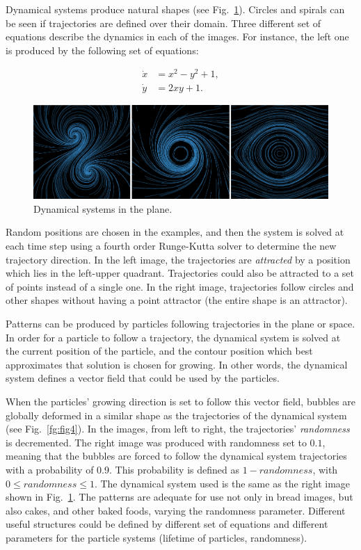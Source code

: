 \documentclass[oneside,a4paper,english,links]{amca}
\begin{document}
Dynamical systems produce natural shapes (see
Fig.~\ref{fg:fig3}). Circles and spirals can be seen if trajectories
are defined over their domain. Three different set of equations
describe the dynamics in each of the images. For instance, the left
one is produced by the following set of equations:

\begin{equation} \label{eq:simple}  
  \begin{aligned}
    \dot{x} &= x^{2}-y^{2}+1,\\
    \dot{y} &= 2xy+1.
  \end{aligned}
\end{equation}


\begin{figure}[htb!]
  \centerline{\includegraphics[scale=0.28]{fig3}}
  \caption{Dynamical systems in the plane.}
  \label{fg:fig3}
\end{figure}


Random positions are chosen in the examples, and then the system is solved at each time step using a fourth order Runge-Kutta solver to determine the new trajectory direction. In the left image, the trajectories are {\em attracted} by a position which lies in the left-upper quadrant. Trajectories could also be attracted to a set of points instead of a single one. In the right image, trajectories follow circles and other shapes without having a point attractor (the entire shape is an attractor).

Patterns can be produced by particles following trajectories in the plane or space. In order for a particle to follow a trajectory, the dynamical system is solved at the current position of the particle, and the contour position which best approximates that solution is chosen for growing. In other words, the dynamical system defines a vector field that could be used by the particles.

When the particles' growing direction is set to follow this vector field, bubbles are globally deformed in a similar shape as the
trajectories of the dynamical system (see Fig.~\ref{fg:fig4}). In the
images, from left to right, the trajectories' {\em randomness} is decremented. The right image was produced with randomness set to $0.1$, meaning
that the bubbles are forced to follow the dynamical system
trajectories with a probability of 0.9. This probability is defined as
$1-randomness$, with $0 \leq randomness \leq 1$. The dynamical system
used is the same as the right image shown in Fig.~\ref{fg:fig3}.  The
patterns are adequate for use not only in bread images, but also
cakes, and other baked foods, varying the randomness
parameter. Different useful structures could be defined by different set of equations and different parameters for the
particle systems (lifetime of particles, randomness).
\end{document}
